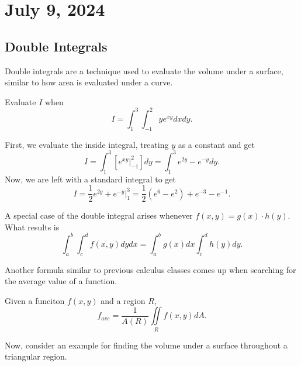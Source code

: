 \chapter{July 9, 2024}

\section{Double Integrals}

Double integrals are a technique used to evaluate the volume under a surface, similar to how area is evaluated under a curve.

\begin{example}
    Evaluate $I$ when
    \[I = \int_{1}^{3}\int_{-1}^{2}ye^{xy}dxdy.\]

    \begin{soln}
        First, we evaluate the inside integral, treating $y$ as a constant and get
        \[I = \int_{1}^{3}\left[e^{xy}\biggr\rvert_{-1}^{2}\right]dy = \int_{1}^{3}e^{2y} - e^{-y}dy.\]
        Now, we are left with a standard integral to get
        \[I = \frac{1}{2}e^{2y} + e^{-y}\biggr\rvert_{1}^{3} = \frac{1}{2}\left(e^{6} - e^{2}\right) + e^{-3} - e^{-1}.\]
    \end{soln}
\end{example}

\begin{remark}
    A special case of the double integral arises whenever $f(x, y) = g(x) \cdot h(y)$. What results is
    \[\int_{a}^{b}\int_{c}^{d}f(x, y)dydx = \int_{a}^{b}g(x)dx\int_{c}^{d}h(y)dy.\]
\end{remark}

Another formula similar to previous calculus classes comes up when searching for the average value of a function.

\begin{theorem}
    Given a funciton $f(x, y)$ and a region $R$,
    \[f_{ave} = \frac{1}{A(R)}\iint\limits_{R}f(x, y)dA.\]
\end{theorem}

Now, consider an example for finding the volume under a surface throughout a triangular region.

